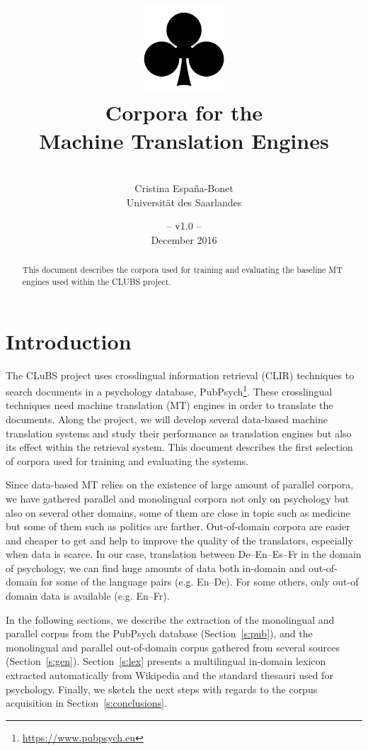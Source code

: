 \documentclass[a4paper,11pt]{article}
\title{
\includegraphics[width=3cm]{./img/200px-SuitClubs.png} \\
\Huge Corpora for the \\ Machine Translation Engines \\ 
}
\author{\vspace*{1cm}\\ \LARGE Cristina Espa\~na-Bonet \medskip \\ \Large Universit\"at des Saarlandes}
\date{\vspace*{2cm} -- v1.0 --\\December 2016}
\begin{document}
\clearpage\maketitle
\thispagestyle{empty}

\vspace*{5cm}
\begin{abstract}
This document describes the corpora used for training and evaluating the baseline MT engines used within the CLUBS project.
\end{abstract}

\newpage
\tableofcontents
\clearpage


\section{Introduction}
\label{s:intro}

The CLuBS project uses crosslingual information retrieval (CLIR) techniques to search documents in a psychology database, PubPsych\footnote{\url{https://www.pubpsych.eu}}. These crosslingual techniques need machine translation (MT) engines in order to translate the documents. Along the project, we will develop several data-based machine translation systems and study their performance as translation engines but also its effect within the retrieval system. This document describes the first selection of corpora used for training and evaluating the systems.

Since data-based MT relies on the existence of large amount of parallel corpora, we have gathered parallel and monolingual corpora not only on psychology but also on several other domains, some of them are close in topic such as 
medicine but some of them such as politics are farther. Out-of-domain corpora are easier and cheaper to get and help to improve the quality of the translators, especially when data is scarce. In our case, translation between De--En--Es--Fr in the domain of psychology, we can find huge amounts of data both in-domain and out-of-domain for some of the language pairs (e.g. En--De). For some others, only out-of domain data is available (e.g. En--Fr). 

In the following sections, we describe the extraction of the monolingual and parallel corpus from the PubPsych database (Section~\ref{s:pub}), and the monolingual and parallel out-of-domain corpus gathered from several sources (Section~\ref{s:gen}). Section~\ref{s:lex} presents a multilingual in-domain lexicon extracted automatically from Wikipedia and the standard thesauri used for psychology. Finally, we sketch the next steps with regards to the corpus acquisition in Section~\ref{s:conclusions}.
\end{document}
